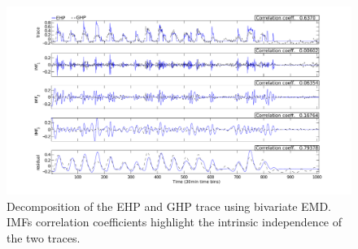 
\begin{figure}[tb]
\hspace{-2cm}
\includegraphics[width=1.2\textwidth]{figs/emd_25_41-eps-converted-to}
\vspace{-1cm}
\caption{Decomposition of the EHP and GHP trace using bivariate EMD. IMFs correlation coefficients highlight the intrinsic independence of the two traces.}
\label{fig:emd2}
\end{figure}






